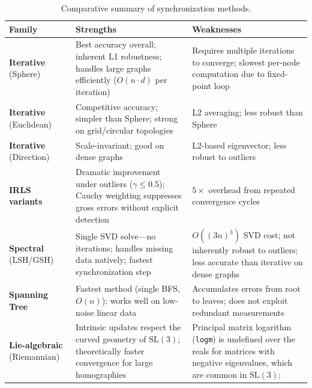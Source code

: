 \documentclass[11pt, a4paper]{article}
\begin{document}
\begin{table}[H]
\centering
\caption{Comparative summary of synchronization methods.}
\label{tab:summary}
\small
\begin{tabular}{@{}lp{5.5cm}p{5.5cm}@{}}
\toprule
\textbf{Family} & \textbf{Strengths} & \textbf{Weaknesses} \\
\midrule
\textbf{Iterative} (Sphere) &
    Best accuracy overall; inherent L1 robustness; handles large graphs
    efficiently ($O(n \cdot d)$ per iteration) &
    Requires multiple iterations to converge; slowest per-node computation
    due to fixed-point loop \\
\addlinespace
\textbf{Iterative} (Euclidean) &
    Competitive accuracy; simpler than Sphere; strong on grid/circular
    topologies &
    L2 averaging; less robust than Sphere \\
\addlinespace
\textbf{Iterative} (Direction) &
    Scale-invariant; good on dense graphs &
    L2-based eigenvector; less robust to outliers \\
\addlinespace
\textbf{IRLS variants} &
    Dramatic improvement under outliers ($\gamma \leq 0.5$); Cauchy
    weighting suppresses gross errors without explicit detection &
    $5\times$ overhead from repeated convergence cycles \\
\addlinespace
\textbf{Spectral} (LSH/GSH) &
    Single SVD solve---no iterations; handles missing data natively;
    fastest synchronization step &
    $O((3n)^3)$ SVD cost; not inherently robust to outliers; less
    accurate than iterative on dense graphs \\
\addlinespace
\textbf{Spanning Tree} &
    Fastest method (single BFS, $O(n)$); works well on low-noise linear
    data &
    Accumulates errors from root to leaves; does not exploit redundant
    measurements \\
\addlinespace
\textbf{Lie-algebraic} (Riemannian) &
    Intrinsic updates respect the curved geometry of $\mathrm{SL}(3)$;
    theoretically faster convergence for large homographies &
    Principal matrix logarithm (\texttt{logm}) is undefined over the reals
    for matrices with negative eigenvalues, which are common in $\mathrm{SL}(3)$; \\
\bottomrule
\end{tabular}
\end{table}
\end{document}
